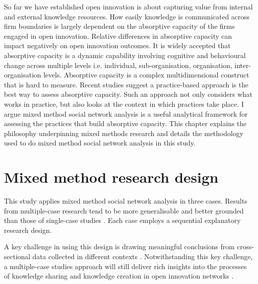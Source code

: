 
So far we have established open innovation is about capturing value from internal and external knowledge resources. How easily knowledge is communicated across firm boundaries is largely dependent on the absorptive capacity of the firms engaged in open innovation. Relative differences in absorptive capacity can impact negatively on open innovation outcomes. It is widely accepted that absorptive capacity is a dynamic capability involving cognitive and behavioural change across multiple levels i.e. individual, sub-organisation, organisation, inter-organisation levels. Absorptive capacity is a complex multidimensional construct that is hard to measure. Recent studies suggest a practice-based approach is the best way to assess absorptive capacity. Such an approach not only considers what works in practice, but also looks at the context in which practices take place. I argue mixed method social network analysis is a useful analytical framework for assessing the practices that build absorptive capacity. This chapter explains the philosophy underpinning mixed methods research and details the methodology used to do mixed method social network analysis in this study.




\section{Mixed method research design}


This study applies mixed method social network analysis in three cases. Results from multiple-case research tend to be more generalisable and better grounded than those of single-case studies \citep{eisenhardt2007theory}. Each case employs a sequential explanatory research design.

A key challenge in using this design is drawing meaningful conclusions from cross-sectional data collected in different contexts \citep{eisenhardt2007theory}. Notwithstanding this key challenge, a multiple-case studies approach will still deliver rich insights into the processes of knowledge sharing and knowledge creation in open innovation networks \citep{walsham1995interpretive}.

